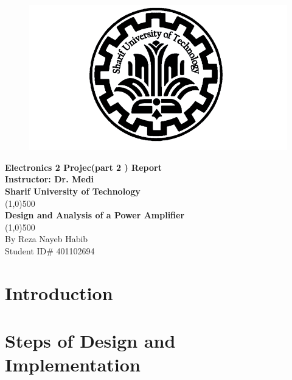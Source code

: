 \documentclass[11pt]{article}
\begin{document}
    
\begin{titlepage}
\begin{center}

\begin{figure}[H]
\begin{center}
\includegraphics[scale=0.4]{Fig/SUT.png}

\end{center}
\end{figure}

\huge{\textbf{Electronics 2 Projec(part 2   ) Report}} \\ 
\vspace*{2cm}
\Large{\textbf{Instructor: Dr. Medi}} \\
\vspace*{1cm}
\huge{\textbf{Sharif University of Technology}} \\
\line(1,0){500} \\ 
\Huge{\textbf{Design and Analysis of a Power Amplifier}} \\
\line(1,0){500} \\
\vfill
\Large{By Reza Nayeb Habib}\\
\Large{Student ID\# 401102694} \\

\end{center}
\end{titlepage}

\tableofcontents
\thispagestyle{empty}
\clearpage
\setcounter{page}{1}

\section{Introduction}
\section{Steps of Design and Implementation}
\end{document}
